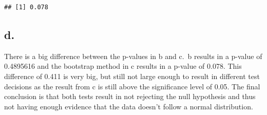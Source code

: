 \documentclass[
]{article}
\newenvironment{Shaded}{\begin{snugshade}}{\end{snugshade}}
\newcommand{\AttributeTok}[1]{\textcolor[rgb]{0.13,0.29,0.53}{#1}}
\newcommand{\CommentTok}[1]{\textcolor[rgb]{0.56,0.35,0.01}{\textit{#1}}}
\newcommand{\ControlFlowTok}[1]{\textcolor[rgb]{0.13,0.29,0.53}{\textbf{#1}}}
\newcommand{\DecValTok}[1]{\textcolor[rgb]{0.00,0.00,0.81}{#1}}
\newcommand{\FunctionTok}[1]{\textcolor[rgb]{0.13,0.29,0.53}{\textbf{#1}}}
\newcommand{\NormalTok}[1]{#1}
\newcommand{\OtherTok}[1]{\textcolor[rgb]{0.56,0.35,0.01}{#1}}
\newcommand{\SpecialCharTok}[1]{\textcolor[rgb]{0.81,0.36,0.00}{\textbf{#1}}}
\newcommand{\StringTok}[1]{\textcolor[rgb]{0.31,0.60,0.02}{#1}}
\begin{document}
\begin{Shaded}
\end{Shaded}

\begin{verbatim}
## [1] 0.078
\end{verbatim}

\subsection{d.}\label{d.-1}

There is a big difference between the p-values in b and c.~b results in
a p-value of 0.4895616 and the bootstrap method in c results in a
p-value of 0.078. This difference of 0.411 is very big, but still not
large enough to result in different test decisions as the result from c
is still above the significance level of 0.05. The final conclusion is
that both tests result in not rejecting the null hypothesis and thus not
having enough evidence that the data doesn't follow a normal
distribution.
\end{document}
